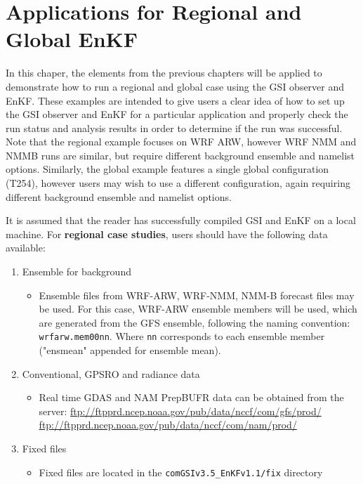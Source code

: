 \chapter{Applications for Regional and Global EnKF}
\setlength{\parskip}{12pt}

In this chaper, the elements from the previous chapters will be applied to demonstrate how to run a regional and global case using the GSI observer and EnKF. These examples are intended to give users a clear idea of how to set up the GSI observer and EnKF for a particular application and properly check the run status and analysis results in order to determine if the run was successful. Note that the regional example focuses on WRF ARW, however WRF NMM and NMMB runs are similar, but require different background ensemble and namelist options. Similarly, the global example features a single global configuration (T254), however users may wish to use a different configuration, again requiring different background ensemble and namelist options.

It is assumed that the reader has successfully compiled GSI and EnKF on a local machine. 
For \textbf{regional case studies}, users should have the following data available:
\begin{enumerate}
\item Ensemble for background
\begin{itemize}
\item Ensemble files from WRF-ARW, WRF-NMM, NMM-B forecast files may be
used. For this case, WRF-ARW ensemble members will be used, which are generated from the GFS ensemble, following the naming convention: \verb|wrfarw.mem00nn|. Where \verb|nn| corresponds to each ensemble member ("ensmean" appended for ensemble mean).
\end{itemize}
\item Conventional, GPSRO and radiance data
\begin{itemize}
\item Real time GDAS and NAM PrepBUFR data can be obtained from the server:
\url{ftp://ftpprd.ncep.noaa.gov/pub/data/nccf/com/gfs/prod/}   \\
\url{ftp://ftpprd.ncep.noaa.gov/pub/data/nccf/com/nam/prod/}  \\
\end{itemize}
\item Fixed files
\begin{itemize}
\item Fixed files are located in the \verb|comGSIv3.5_EnKFv1.1/fix| directory
\end{itemize}
\end{enumerate}

